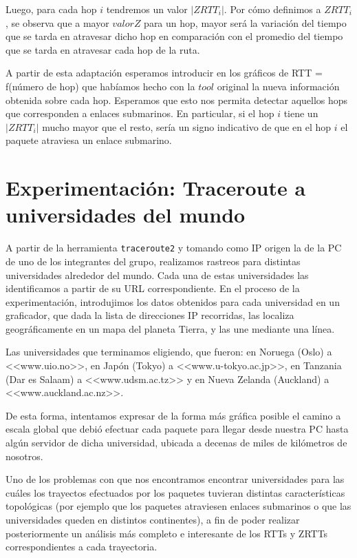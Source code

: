 \documentclass[final,inline,a4paper,narroweqnarray]{ieee}
\let\Oldsection\section
\renewcommand{\section}{\FloatBarrier\Oldsection}
\begin{document}
  Luego, para cada hop $i$ tendremos un valor $|ZRTT_i|$. Por cómo definimos a $ZRTT_i$, 
  se observa que a mayor $valor Z$ para un hop, mayor será la variación del tiempo que se
  tarda en atravesar dicho hop en comparación con el promedio del tiempo que se tarda 
  en atravesar cada hop de la ruta.

  A partir de esta adaptación esperamos introducir en los gráficos de RTT = f(número de hop) 
  que habíamos hecho con la $tool$ original la nueva información obtenida sobre cada hop.
  Esperamos que esto nos permita detectar aquellos hops que corresponden a enlaces submarinos. 
  En particular, si el hop $i$ tiene un $|ZRTT_i|$ mucho mayor que el resto, sería un signo
  indicativo de que en el hop $i$ el paquete atraviesa un enlace submarino. 

\section{Experimentación: Traceroute a universidades del mundo}

A partir de la herramienta \texttt{traceroute2} y tomando como IP origen la de la PC de uno de los integrantes del grupo,
realizamos rastreos para distintas universidades alrededor del mundo. Cada una de estas universidades las identificamos
a partir de su URL correspondiente. 
En el proceso de la experimentación, introdujimos los datos obtenidos para cada universidad en un graficador, que 
dada la lista de direcciones IP recorridas, las localiza geográficamente en un mapa del planeta Tierra, 
y las une mediante una línea.

Las universidades que terminamos eligiendo, que fueron: en Noruega (Oslo) a <<www.uio.no>>, en 
Japón (Tokyo) a <<www.u-tokyo.ac.jp>>, en Tanzania (Dar es Salaam) a <<www.udsm.ac.tz>> y 
en Nueva Zelanda (Auckland) a <<www.auckland.ac.nz>>. 

De esta forma, intentamos expresar de la forma más gráfica posible el camino a 
escala global que debió efectuar cada paquete para llegar desde nuestra PC hasta algún servidor de dicha universidad, 
ubicada a decenas de miles de kilómetros de nosotros. 

Uno de los problemas con que nos encontramos encontrar universidades para las cuáles los trayectos efectuados por los paquetes 
tuvieran distintas características topológicas (por ejemplo que los paquetes atraviesen enlaces submarinos o que
las universidades queden en distintos continentes), a fin 
de poder realizar posteriormente un análisis más completo e interesante de los RTTs y ZRTTs
correspondientes a cada trayectoria.  
\end{document}

